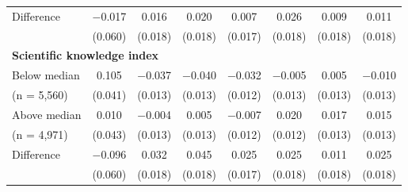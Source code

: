 \begin{tabular}[t]{lccccccc}
\hspace{1em}  Difference & \num{-0.017} & \num{0.016} & \num{0.020} & \num{0.007} & \num{0.026} & \num{0.009} & \num{0.011}\\
\hspace{2em} & (\num{0.060}) & (\num{0.018}) & (\num{0.018}) & (\num{0.017}) & (\num{0.018}) & (\num{0.018}) & (\num{0.018})\\\multicolumn{4}{l}{\textbf{Scientific knowledge index}} \rule{0pt}{1.2\normalbaselineskip}\\
\hspace{1em} Below median & \num{0.105} & \num{-0.037} & \num{-0.040} & \num{-0.032} & \num{-0.005} & \num{0.005} & \num{-0.010}\\
\hspace{2em}(n = 5,560) & (\num{0.041}) & (\num{0.013}) & (\num{0.013}) & (\num{0.012}) & (\num{0.013}) & (\num{0.013}) & (\num{0.013})\\
\hspace{1em} Above median & \num{0.010} & \num{-0.004} & \num{0.005} & \num{-0.007} & \num{0.020} & \num{0.017} & \num{0.015}\\
\hspace{2em}(n = 4,971) & (\num{0.043}) & (\num{0.013}) & (\num{0.013}) & (\num{0.012}) & (\num{0.012}) & (\num{0.013}) & (\num{0.013})\\\cmidrule(lr){2-8}
\hspace{1em} Difference & \num{-0.096} & \num{0.032} & \num{0.045} & \num{0.025} & \num{0.025} & \num{0.011} & \num{0.025}\\
\hspace{2em} & (\num{0.060}) & (\num{0.018}) & (\num{0.018}) & (\num{0.017}) & (\num{0.018}) & (\num{0.018}) & (\num{0.018})\\
\end{tabular}
